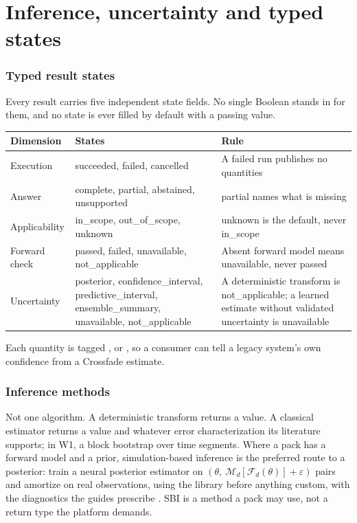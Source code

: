 \documentclass[11pt,a4paper]{article}
\begin{document}
\part{Inference, uncertainty and typed states}

\section{Typed result states}
\label{sec:states}

Every result carries five independent state fields. No single Boolean stands in for them, and no state is ever filled by default with a passing value. \tagG{}

\begin{center}\small
\begin{tabular}{@{}p{2.2cm}p{5.6cm}p{6.2cm}@{}}
\toprule
Dimension & States & Rule \\
\midrule
Execution & succeeded, failed, cancelled & A failed run publishes no quantities \\
Answer & complete, partial, abstained, unsupported & partial names what is missing \\
Applicability & in\_scope, out\_of\_scope, unknown & unknown is the default, never in\_scope \\
Forward check & passed, failed, unavailable, not\_applicable & Absent forward model means unavailable, never passed \\
Uncertainty & posterior, confidence\_interval, predictive\_interval, ensemble\_summary, unavailable, not\_applicable & A deterministic transform is not\_applicable; a learned estimate without validated uncertainty is unavailable \\
\bottomrule
\end{tabular}
\end{center}
Each quantity is tagged ,  or , so a consumer can tell a legacy system's own confidence from a Crossfade estimate.

\section{Inference methods}

Not one algorithm. A deterministic transform returns a value. A classical estimator returns a value and whatever error characterization its literature supports; in W1, a block bootstrap over time segments. Where a pack has a forward model and a prior, simulation-based inference is the preferred route to a posterior: train a neural posterior estimator on $(\theta,\ \mathcal M_d[\mathcal F_d(\theta)]+\varepsilon)$ pairs and amortize on real observations, using the  library before anything custom, with the diagnostics the guides prescribe \citep{deistler2025,dax2026}. SBI is a method a pack may use, not a return type the platform demands.
\end{document}
